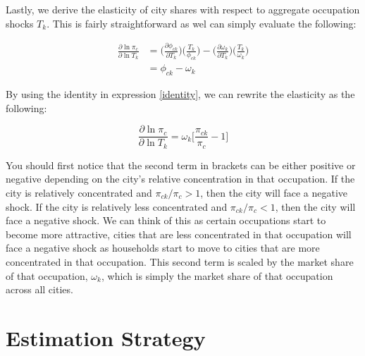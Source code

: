 \documentclass[10pt]{article}
\begin{document}
Lastly, we derive the elasticity of city shares with respect to aggregate occupation shocks $T_k$. This is fairly straightforward as wel can simply evaluate the following:

\begin{align*}
    \frac{\partial\ln{\pi_{c}}}{\partial\ln{T_{k}}} & = \Big(\frac{\partial{\phi_{ck}}}{\partial{T_{k}}}\Big)\Big(\frac{T_{k}}{\phi_{ck}}\Big) - \Big(\frac{\partial{\omega_{k}}}{\partial{T_{k}}}\Big)\Big(\frac{T_{k}}{\omega_{k}}\Big) \\ &= \phi_{ck}-\omega_{k}
\end{align*}

By using the identity in expression \ref{identity}, we can rewrite the elasticity as the following:

\begin{equation}
    \frac{\partial\ln{\pi_{c}}}{\partial\ln{T_{k}}} = {\omega_{k}}\Bigg[\frac{\pi_{ck}}{\pi_{c}}-1\Bigg]
\end{equation}

You should first notice that the second term in brackets can be either positive or negative depending on the city's relative concentration in that occupation. If the city is relatively concentrated and $\pi_{ck} / \pi_c > 1$, then the city will face a negative shock. If the city is relatively less concentrated and $\pi_{ck} / \pi_c < 1$, then the city will face a negative shock. We can think of this as certain occupations start to become more attractive, cities that are less concentrated in that occupation will face a negative shock as households start to move to cities that are more concentrated in that occupation. This second term is scaled by the market share of that occupation, $\omega_k$, which is simply the market share of that occupation across all cities.

\section{Estimation Strategy}


\end{document}
